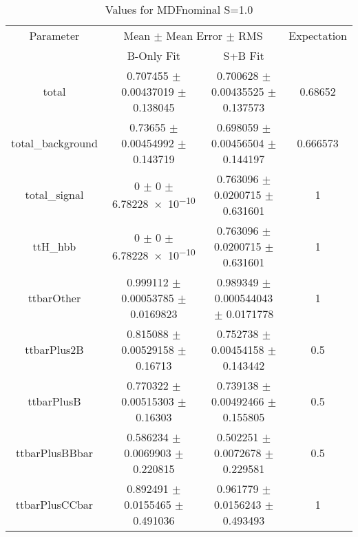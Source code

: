 \begin{table}
\centering
\caption{Values for MDFnominal S=1.0}
\begin{tabular}{cccc}
\toprule
Parameter & \multicolumn{2}{c}{Mean $\pm$ Mean Error $\pm$ RMS} & Expectation\\
 & B-Only Fit & S+B Fit & \\
\midrule
total & \num{0.707455} $\pm$ \num{0.00437019} $\pm$ \num{0.138045} & \num{0.700628} $\pm$ \num{0.00435525} $\pm$ \num{0.137573} & \num{0.68652}\\
total\_background & \num{0.73655} $\pm$ \num{0.00454992} $\pm$ \num{0.143719} & \num{0.698059} $\pm$ \num{0.00456504} $\pm$ \num{0.144197} & \num{0.666573}\\
total\_signal & \num{0} $\pm$ \num{0} $\pm$ \num{6.78228e-10} & \num{0.763096} $\pm$ \num{0.0200715} $\pm$ \num{0.631601} & \num{1}\\
ttH\_hbb & \num{0} $\pm$ \num{0} $\pm$ \num{6.78228e-10} & \num{0.763096} $\pm$ \num{0.0200715} $\pm$ \num{0.631601} & \num{1}\\
ttbarOther & \num{0.999112} $\pm$ \num{0.00053785} $\pm$ \num{0.0169823} & \num{0.989349} $\pm$ \num{0.000544043} $\pm$ \num{0.0171778} & \num{1}\\
ttbarPlus2B & \num{0.815088} $\pm$ \num{0.00529158} $\pm$ \num{0.16713} & \num{0.752738} $\pm$ \num{0.00454158} $\pm$ \num{0.143442} & \num{0.5}\\
ttbarPlusB & \num{0.770322} $\pm$ \num{0.00515303} $\pm$ \num{0.16303} & \num{0.739138} $\pm$ \num{0.00492466} $\pm$ \num{0.155805} & \num{0.5}\\
ttbarPlusBBbar & \num{0.586234} $\pm$ \num{0.0069903} $\pm$ \num{0.220815} & \num{0.502251} $\pm$ \num{0.0072678} $\pm$ \num{0.229581} & \num{0.5}\\
ttbarPlusCCbar & \num{0.892491} $\pm$ \num{0.0155465} $\pm$ \num{0.491036} & \num{0.961779} $\pm$ \num{0.0156243} $\pm$ \num{0.493493} & \num{1}\\
\bottomrule
\end{tabular}
\end{table}